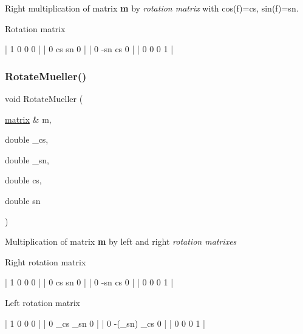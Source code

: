 Right multiplication of matrix {\bfseries m} by {\itshape  rotation matrix } with cos(f)=cs, sin(f)=sn. 

Rotation matrix 
\begin{DoxyCode}
| 1  0   0   0 |
| 0  cs  sn  0 |
| 0  -sn cs  0 |
| 0  0   0   1 |
\end{DoxyCode}
 \mbox{\label{group___ax_func_ga3036e67532f4d1f5001eb52ee8ad16bc}} 
\subsubsection{\texorpdfstring{Rotate\+Mueller()}{RotateMueller()}}
{\footnotesize\ttfamily void Rotate\+Mueller (\begin{DoxyParamCaption}\item[{\mbox{\hyperlink{classmatrix}{matrix}} \&}]{m,  }\item[{double}]{\+\_\+cs,  }\item[{double}]{\+\_\+sn,  }\item[{double}]{cs,  }\item[{double}]{sn }\end{DoxyParamCaption})}



Multiplication of matrix {\bfseries m} by left and right {\itshape  rotation matrixes } 

Right rotation matrix 
\begin{DoxyCode}
| 1  0   0   0 |
| 0  cs  sn  0 |
| 0  -sn cs  0 |
| 0  0   0   1 |
\end{DoxyCode}


Left rotation matrix 
\begin{DoxyCode}
| 1   0      0   0 |
| 0   \_cs    \_sn 0 |
| 0  -(\_sn)  \_cs 0 |
| 0   0      0   1 |
\end{DoxyCode}
 
